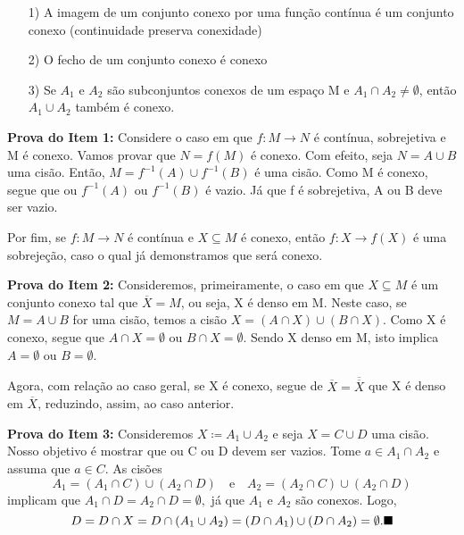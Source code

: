 \documentclass[metric_notes.tex]{subfiles}
\begin{document}
\begin{prop*}
	\begin{itemize}
		\item[1)] A imagem de um conjunto conexo por uma função contínua é um conjunto conexo (continuidade preserva conexidade)
		\item[2)] O fecho de um conjunto conexo é conexo
		\item[3)] Se \(A_{1}\) e \(A_{2}\) são subconjuntos conexos de um espaço M e
		      \(A_{1}\cap A_{2}\neq\emptyset\), então \(A_{1}\cup A_{2}\) também é conexo.
	\end{itemize}
\end{prop*}
\begin{proof*}
	\textbf{Prova do Item 1:} Considere o caso em que \(f:M\rightarrow N\) é contínua, sobrejetiva e M é conexo.
	Vamos provar que \(N = f(M)\) é conexo. Com efeito, seja \(N=A\cup{B}\) uma cisão.
	Então, \(M = f^{-1}(A)\cup f^{-1}(B)\) é uma cisão. Como M é conexo, segue que ou \(f^{-1}(A)\) ou \(f^{-1}(B)\) é vazio.
	Já que f é sobrejetiva, A ou B deve ser vazio.

	Por fim, se \(f:M\rightarrow N\) é contínua e \(X\subseteq{M}\) é conexo, então
	\(f:X\rightarrow f(X)\) é uma sobrejeção, caso o qual já demonstramos que será conexo.

	\textbf{Prova do Item 2:} Consideremos, primeiramente, o caso em que \(X\subseteq{M}\) é um conjunto conexo tal que
	\(\overline{X} = M\), ou seja, X é denso em M. Neste caso, se \(M = A\cup B\) for uma cisão, temos a cisão
	\(X = (A\cap X)\cup(B\cap X)\). Como X é conexo, segue que \(A\cap X = \emptyset\) ou \(B\cap X = \emptyset\). Sendo X denso
	em M, isto implica \(A = \emptyset\) ou \(B = \emptyset\).

	Agora, com relação ao caso geral, se X é conexo, segue de \(\overline{X} = \overline{\overline{X}}\) que X é denso em \(\overline{X}\), reduzindo, assim,
	ao caso anterior.

	\textbf{Prova do Item 3:} Consideremos \(X\coloneqq A_{1}\cup A_{2}\) e seja \(X = C\cup D\) uma cisão. Nosso objetivo é mostrar que
	ou C ou D devem ser vazios. Tome \(a\in A_{1}\cap A_{2}\) e assuma que \(a\in C\). As cisões
	\[
		A_{1} = (A_{1}\cap C)\cup (A_{2}\cap D)\quad\text{e}\quad A_{2} = (A_{2}\cap C)\cup(A_{2}\cap D)
	\]
	implicam que \(A_{1}\cap D = A_{2}\cap D = \emptyset, \) já que \(A_{1}\) e \(A_{2}\) são conexos. Logo,
	\[
		D = D\cap X = D\cap(A_{1}\cup A_{2}) = (D\cap A_{1})\cup(D\cap A_{2}) = \emptyset.\text{$\blacksquare$}
	\]
\end{proof*}
\end{document}
